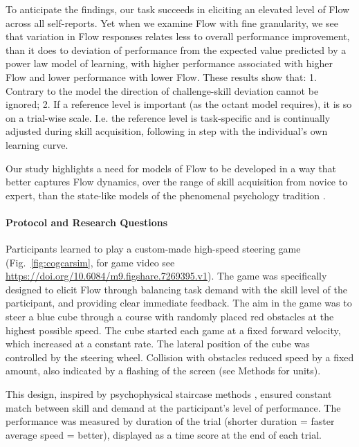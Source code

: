\documentclass{frontierstyle/frontiersSCNS}
\begin{document}
To anticipate the findings, our task succeeds in eliciting an elevated level of Flow across all self-reports. Yet when we examine Flow with fine granularity, we see that variation in Flow responses relates less to overall performance improvement, than it does to deviation of performance from the expected value predicted by a power law model of learning, with higher performance associated with higher Flow and lower performance with lower Flow. These results show that: 1. Contrary to the \cite{Keller2012} model the direction of challenge-skill deviation cannot be ignored; 2. If a reference level is important (as the octant model requires), it is so on a trial-wise scale. I.e. the reference level is task-specific and is continually adjusted during skill acquisition, following in step with the individual's own learning curve.

Our study highlights a need for models of Flow to be developed in a way that better captures Flow dynamics, over the range of skill acquisition from novice to expert, than the state-like models of the phenomenal psychology tradition \citep{Moneta2012}.

\paragraph*{Protocol and Research Questions}

Participants learned to play a custom-made high-speed steering game (Fig.~\ref{fig:cogcarsim}, for game video see \url{https://doi.org/10.6084/m9.figshare.7269395.v1}). The game was specifically designed to elicit Flow through balancing task demand with the skill level of the participant, and providing clear immediate feedback. The aim in the game was to steer a blue cube through a course with randomly placed red obstacles at the highest possible speed. The cube started each game at a fixed forward velocity, which increased at a constant rate. The lateral position of the cube was controlled by the steering wheel. Collision with obstacles reduced speed by a fixed amount, also indicated by a flashing of the screen (see Methods for units).

This design, inspired by psychophysical staircase methods \citep{Cornsweet1962}, ensured constant match between skill and demand at the participant's level of performance. The performance was measured by duration of the trial (shorter duration = faster average speed = better), displayed as a time score at the end of each trial.
\end{document}
